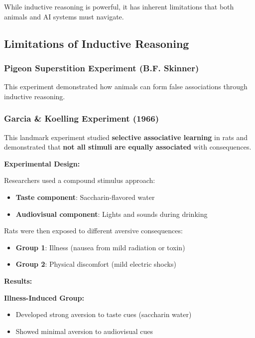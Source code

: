 While inductive reasoning is powerful, it has inherent limitations that both animals and AI systems must navigate.

\subsection{Limitations of Inductive Reasoning}

\subsubsection{Pigeon Superstition Experiment (B.F. Skinner)}

This experiment demonstrated how animals can form false associations through inductive reasoning.

\subsubsection{Garcia \& Koelling Experiment (1966)}

This landmark experiment studied \textbf{selective associative learning} in rats and demonstrated that \textbf{not all stimuli are equally associated} with consequences.

\textbf{Experimental Design:}

Researchers used a compound stimulus approach:

\begin{itemize}
\item \textbf{Taste component}: Saccharin-flavored water
\item \textbf{Audiovisual component}: Lights and sounds during drinking
\end{itemize}

Rats were then exposed to different aversive consequences:

\begin{itemize}
\item \textbf{Group 1}: Illness (nausea from mild radiation or toxin)
\item \textbf{Group 2}: Physical discomfort (mild electric shocks)
\end{itemize}

\textbf{Results:}

\textbf{Illness-Induced Group:}

\begin{itemize}
\item Developed strong aversion to taste cues (saccharin water)
\item Showed minimal aversion to audiovisual cues
\end{itemize}

